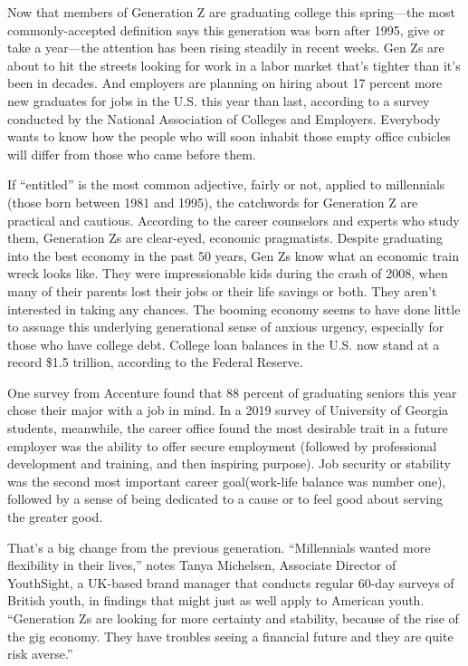 Now that members of Generation Z are graduating college this spring—the most commonly-accepted definition says this generation was born after 1995, give or take a year—the attention has been rising steadily in recent weeks. Gen Zs are about to hit the streets looking for work in a labor market that's tighter than it's been in decades. And employers are planning on hiring about 17 percent more new graduates for jobs in the U.S. this year than last, according to a survey conducted by the National Association of Colleges and Employers. Everybody wants to know how the people who will soon inhabit those empty office cubicles will differ from those who came before them.


If ``entitled'' is the most common adjective, fairly or not, applied to   millennials (those born between 1981 and 1995), the catchwords for Generation   Z are practical and cautious. According to the career counselors and experts who study them, Generation Zs are clear-eyed, economic pragmatists. Despite  graduating into the best economy in the past 50 years, Gen Zs know what an economic train wreck looks like. They were impressionable kids during the crash   of 2008, when many of their parents lost their jobs or their life savings or both.  They aren't interested in taking any chances. The booming economy seems to    have done little to assuage this underlying generational sense of anxious urgency, especially for those who have college debt. College loan balances in the U.S.   now stand at a record \$1.5 trillion, according to the Federal Reserve.


One survey from Accenture found that 88 percent of graduating seniors this year chose their major with a job in mind. In a 2019 survey of University of Georgia students, meanwhile, the career office found the most desirable trait in a future employer was the ability to offer secure employment (followed by professional development and training, and then inspiring purpose). Job security or stability was the second most important career goal(work-life balance was number one), followed by a sense of being dedicated to a cause or to feel good about serving the greater good.


That's a big change from the previous generation. ``Millennials wanted more flexibility in their lives,'' notes Tanya Michelsen, Associate Director of YouthSight, a UK-based brand manager that conducts regular 60-day surveys of British youth, in findings that might just as well apply to American youth. ``Generation Zs are looking for more certainty and stability, because of the rise of the gig economy. They have troubles seeing a financial future and they are quite risk averse.''